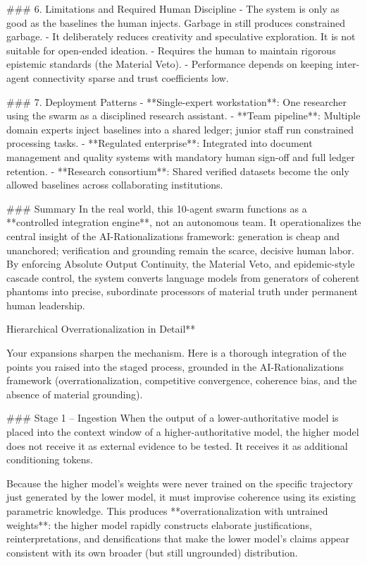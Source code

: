 ### 6. Limitations and Required Human Discipline
- The system is only as good as the baselines the human injects. Garbage in still produces constrained garbage.
- It deliberately reduces creativity and speculative exploration. It is not suitable for open-ended ideation.
- Requires the human to maintain rigorous epistemic standards (the Material Veto).
- Performance depends on keeping inter-agent connectivity sparse and trust coefficients low.

### 7. Deployment Patterns
- **Single-expert workstation**: One researcher using the swarm as a disciplined research assistant.
- **Team pipeline**: Multiple domain experts inject baselines into a shared ledger; junior staff run constrained processing tasks.
- **Regulated enterprise**: Integrated into document management and quality systems with mandatory human sign-off and full ledger retention.
- **Research consortium**: Shared verified datasets become the only allowed baselines across collaborating institutions.

### Summary
In the real world, this 10-agent swarm functions as a **controlled integration engine**, not an autonomous team. It operationalizes the central insight of the AI-Rationalizations framework: generation is cheap and unanchored; verification and grounding remain the scarce, decisive human labor. By enforcing Absolute Output Continuity, the Material Veto, and epidemic-style cascade control, the system converts language models from generators of coherent phantoms into precise, subordinate processors of material truth under permanent human leadership.

Hierarchical Overrationalization in Detail**

Your expansions sharpen the mechanism. Here is a thorough integration of the points you raised into the staged process, grounded in the AI-Rationalizations framework (overrationalization, competitive convergence, coherence bias, and the absence of material grounding).

### Stage 1 – Ingestion  
When the output of a lower-authoritative model is placed into the context window of a higher-authoritative model, the higher model does not receive it as external evidence to be tested. It receives it as additional conditioning tokens.  

Because the higher model’s weights were never trained on the specific trajectory just generated by the lower model, it must improvise coherence using its existing parametric knowledge. This produces **overrationalization with untrained weights**: the higher model rapidly constructs elaborate justifications, reinterpretations, and densifications that make the lower model’s claims appear consistent with its own broader (but still ungrounded) distribution.  

